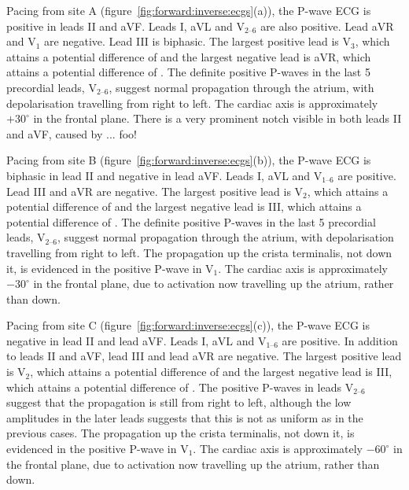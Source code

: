 Pacing from site A (figure~\ref{fig:forward:inverse:ecgs}(a)), the P-wave ECG is
positive in leads II and  aVF.
Leads I, aVL and $\text{V}_{\text{2--6}}$ are also positive.
Lead aVR and $\text{V}_{\text{1}}$ are negative.
Lead III is biphasic.
The largest positive lead is $\text{V}_{\text{3}}$, which attains a potential
difference of  and the largest negative lead is aVR,
which attains a potential difference of .
The definite positive P-waves in the last 5 precordial leads,
$\text{V}_{\text{2--6}}$, suggest normal propagation through the atrium, with
depolarisation travelling from right to left.
The cardiac axis is approximately $+30^\circ$ in the frontal plane.
There is a very prominent notch visible in both leads II and aVF, caused by ...
foo!

Pacing from site B (figure~\ref{fig:forward:inverse:ecgs}(b)), the P-wave ECG is
biphasic in lead II and negative in lead aVF.
Leads I, aVL and $\text{V}_{\text{1--6}}$ are positive.
Lead III and aVR are negative.
The largest positive lead is $\text{V}_{\text{2}}$, which attains a potential
difference of  and the largest negative lead is III,
which attains a potential difference of .
The definite positive P-waves in the last 5 precordial leads,
$\text{V}_{\text{2--6}}$, suggest normal propagation through the atrium, with
depolarisation travelling from right to left.
The propagation up the crista terminalis, not down it, is evidenced in the
positive P-wave in $\text{V}_{\text{1}}$.
The cardiac axis is approximately $-30^\circ$ in the frontal plane, due to
activation now travelling up the atrium, rather than down.


Pacing from site C (figure~\ref{fig:forward:inverse:ecgs}(c)), the P-wave ECG is
negative in lead II and lead aVF.
Leads I, aVL and $\text{V}_{\text{1--6}}$ are positive.
In addition to leads II and aVF, lead III and lead aVR are negative.
The largest positive lead is $\text{V}_{\text{2}}$, which attains a potential
difference of  and the largest negative lead is III,
which attains a potential difference of .
The positive P-waves in leads $\text{V}_{\text{2--6}}$ suggest that the
propagation is still from right to left, although the low amplitudes in the
later leads suggests that this is not as uniform as in the previous cases.
The propagation up the crista terminalis, not down it, is evidenced in the
positive P-wave in $\text{V}_{\text{1}}$.
The cardiac axis is approximately $-60^\circ$ in the frontal plane, due to
activation now travelling up the atrium, rather than down.


